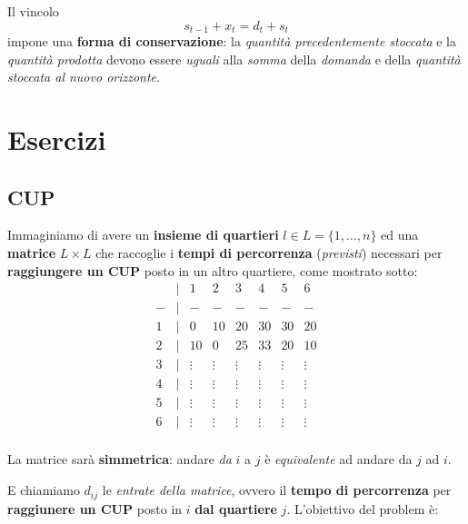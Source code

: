 \begin{remark}
    Il vincolo
    \[
        s_{t-1} + x_t = d_t + s_t
    \]
    impone una \textbf{forma di conservazione}: la \textit{quantità precedentemente stoccata}
    e la \textit{quantità prodotta} devono essere \textit{uguali} alla \textit{somma}
    della \textit{domanda} e della \textit{quantità stoccata al nuovo orizzonte}.
\end{remark}

\section{Esercizi}

\subsection{CUP}

Immaginiamo di avere un \textbf{insieme di quartieri} $l\in L = \{1,\ldots , n\}$ ed 
una \textbf{matrice} $L\times L$ che raccoglie i \textbf{tempi di percorrenza} 
(\textit{previsti}) necessari per \textbf{raggiungere un CUP} 
posto in un altro quartiere, come mostrato sotto:
\[
    \begin{matrix}
        & | & 1 & 2 & 3 & 4 & 5 & 6 \\ 
      - & | & - & - & - & - & - & - \\ 
      1 & | & 0 & 10 & 20 & 30 & 30 & 20 \\ 
      2 & | & 10 & 0 & 25 & 33 & 20 & 10 \\ 
      3 & | & \vdots & \vdots & \vdots & \vdots & \vdots & \vdots \\ 
      4 & | & \vdots & \vdots & \vdots & \vdots & \vdots & \vdots \\ 
      5 & | & \vdots & \vdots & \vdots & \vdots & \vdots & \vdots \\ 
      6 & | & \vdots & \vdots & \vdots & \vdots & \vdots & \vdots \\ 
    \end{matrix}
\]

\begin{remark}
    La matrice sarà \textbf{simmetrica}: andare \textit{da} $i$ a $j$ è
    \textit{equivalente} ad andare da $j$ ad $i$.
\end{remark}

E chiamiamo $d_{ij}$ le \textit{entrate della matrice}, ovvero il \textbf{tempo di percorrenza}
per \textbf{raggiunere un CUP} posto in $i$ \textbf{dal quartiere} $j$.
L'obiettivo del problem è:

